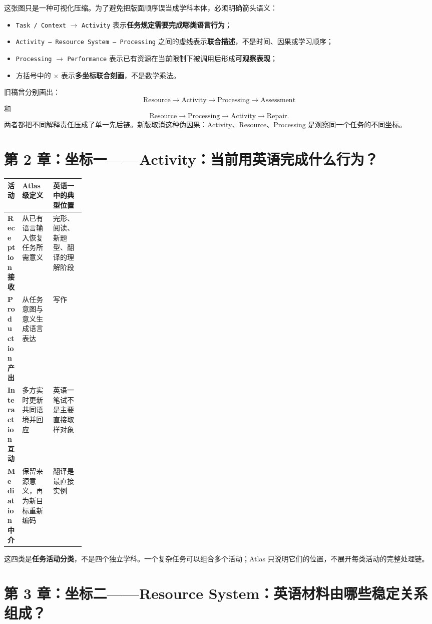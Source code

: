 \documentclass[11pt,a4paper]{ctexart}
\newcommand{\kw}[1]{\textbf{#1}}
\begin{document}
这张图只是一种可视化压缩。为了避免把版面顺序误当成学科本体，必须明确箭头语义：
\begin{itemize}
  \item \texttt{Task / Context} $\to$ \texttt{Activity} 表示\kw{任务规定需要完成哪类语言行为}；
  \item \texttt{Activity -- Resource System -- Processing} 之间的虚线表示\kw{联合描述}，不是时间、因果或学习顺序；
  \item \texttt{Processing} $\to$ \texttt{Performance} 表示已有资源在当前限制下被调用后形成\kw{可观察表现}；
  \item 方括号中的 $\times$ 表示\kw{多坐标联合刻画}，不是数学乘法。
\end{itemize}

\begin{warn}
旧稿曾分别画出：
\[
\text{Resource}\to\text{Activity}\to\text{Processing}\to\text{Assessment}
\]
和
\[
\text{Resource}\to\text{Processing}\to\text{Activity}\to\text{Repair}.
\]
两者都把不同解释责任压成了单一先后链。新版取消这种伪因果：Activity、Resource、Processing 是观察同一个任务的不同坐标。
\end{warn}

\section{第 2 章：坐标一——Activity：当前用英语完成什么行为？}

\begin{center}
\small
\begin{tabularx}{\linewidth}{>{\bfseries}p{0.18\linewidth} X X}
\toprule
活动 & Atlas 级定义 & 英语一中的典型位置 \\
\midrule
Reception 接收 & 从已有语言输入恢复任务所需意义 & 完形、阅读、新题型、翻译的理解阶段 \\
Production 产出 & 从任务意图与意义生成语言表达 & 写作 \\
Interaction 互动 & 多方实时更新共同语境并回应 & 英语一笔试不是主要直接取样对象 \\
Mediation 中介 & 保留来源意义，再为新目标重新编码 & 翻译是最直接实例 \\
\bottomrule
\end{tabularx}
\end{center}

这四类是\kw{任务活动分类}，不是四个独立学科。一个复杂任务可以组合多个活动；Atlas 只说明它们的位置，不展开每类活动的完整处理链。

\section{第 3 章：坐标二——Resource System：英语材料由哪些稳定关系组成？}
\end{document}
